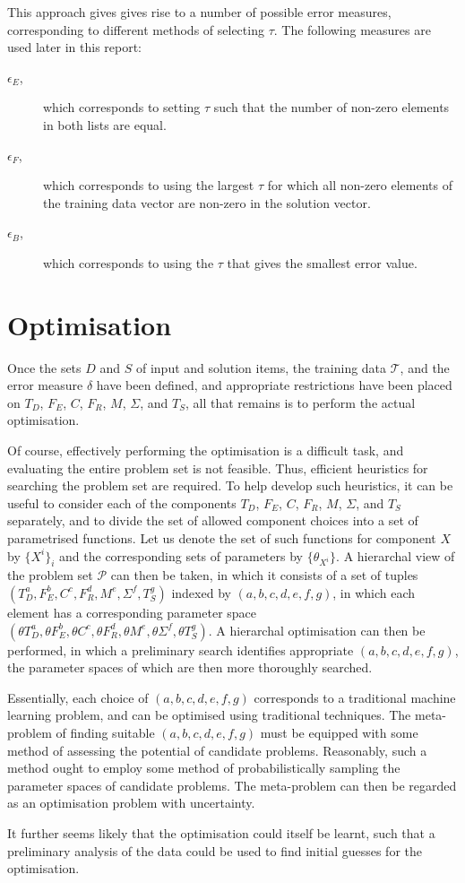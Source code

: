 This approach gives gives rise to a number of possible error measures, corresponding to different methods of selecting $\tau$. The following measures are used later in this report:
\begin{description}
    \item[$\epsilon_{E}$,]which corresponds to setting $\tau$ such that the number of non-zero elements in both lists are equal.
    \item[$\epsilon_{F}$,]which corresponds to using the largest $\tau$ for which all non-zero elements of the training data vector are non-zero in the solution vector.
    \item[$\epsilon_{B}$,]which corresponds to using the $\tau$ that gives the smallest error value.
\end{description}

\section{Optimisation}

Once the sets $D$ and $S$ of input and solution items, the training data $\mathcal{T}$, and the error measure $\delta$ have been defined, and appropriate restrictions have been placed on $T_D$, $F_E$, $C$, $F_R$, $M$, $\Sigma$, and $T_S$, all that remains is to perform the actual optimisation.

Of course, effectively performing the optimisation is a difficult task, and evaluating the entire problem set is not feasible. Thus, efficient heuristics for searching the problem set are required. To help develop such heuristics, it can be useful to consider each of the components $T_D$, $F_E$, $C$, $F_R$, $M$, $\Sigma$, and $T_S$ separately, and to divide the set of allowed component choices into a set of parametrised functions. Let us denote the set of such functions for component $X$ by $\{X^i\}_i$ and the corresponding sets of parameters by $\{\theta_{X^i}\}$. A hierarchal view of the problem set $\mathcal{P}$ can then be taken, in which it consists of a set of tuples $(T_D^a, F_E^b, C^c, F_R^d, M^e, \Sigma^f, T_S^g)$ indexed by $(a, b, c, d, e, f, g)$, in which each element has a corresponding parameter space $(\theta{T_D^a}, \theta{F_E^b}, \theta{C^c}, \theta{F_R^d}, \theta{M^e}, \theta{\Sigma^f}, \theta{T_S^g})$. A hierarchal optimisation can then be performed, in which a preliminary search identifies appropriate $(a, b, c, d, e, f, g)$, the parameter spaces of which are then more thoroughly searched.

Essentially, each choice of $(a, b, c, d, e, f, g)$ corresponds to a traditional machine learning problem, and can be optimised using traditional techniques. The meta-problem of finding suitable $(a, b, c, d, e, f, g)$ must be equipped with some method of assessing the potential of candidate problems. Reasonably, such a method ought to employ some method of probabilistically sampling the parameter spaces of candidate problems. The meta-problem can then be regarded as an optimisation problem with uncertainty.

It further seems likely that the optimisation could itself be learnt, such that a preliminary analysis of the data could be used to find initial guesses for the optimisation.
